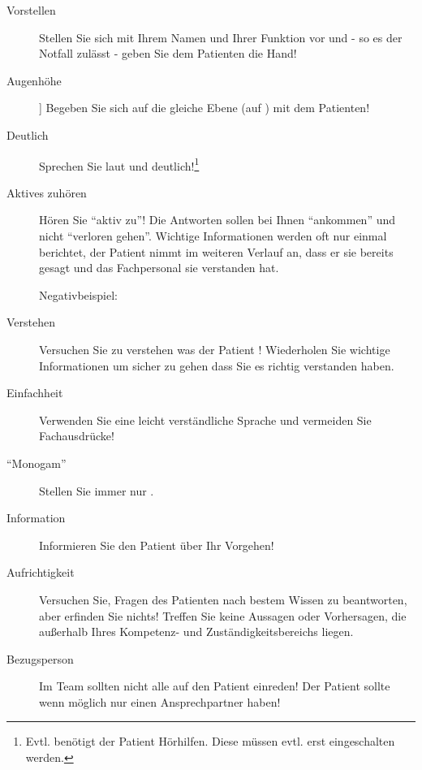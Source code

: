 \begin{description}
    \item[Vorstellen] Stellen Sie sich mit Ihrem Namen und Ihrer Funktion vor
    und - so es der Notfall zulässt - geben Sie dem Patienten die Hand!
    \item[Augenhöhe]] Begeben Sie sich auf die gleiche Ebene (auf )
    mit dem Patienten!
    \item[Deutlich] Sprechen Sie laut und deutlich!\footnote{Evtl. benötigt der
    Patient Hörhilfen. Diese müssen evtl. erst eingeschalten werden.}
    \item[Aktives zuhören] Hören Sie "`aktiv zu"'! Die Antworten sollen bei
    Ihnen "`ankommen"' und nicht "`verloren gehen"'. Wichtige Informationen werden oft nur einmal
    berichtet, der Patient nimmt im weiteren Verlauf an, dass er sie bereits
    gesagt und das Fachpersonal sie verstanden hat.
    
    Negativbeispiel: 
    \item[Verstehen] Versuchen Sie zu verstehen was
    der Patient ! Wiederholen Sie wichtige Informationen um sicher zu
    gehen dass Sie es richtig verstanden haben.
    \item[Einfachheit] Verwenden Sie eine leicht verständliche Sprache und
    vermeiden Sie Fachausdrücke!
    \item["`Monogam"'] Stellen Sie immer nur .
    \item[Information] Informieren Sie den Patient über Ihr Vorgehen!
    \item[Aufrichtigkeit] Versuchen Sie, Fragen des Patienten nach bestem Wissen
    zu beantworten, aber erfinden Sie nichts!  Treffen Sie keine Aussagen oder Vorhersagen, die außerhalb
    Ihres Kompetenz- und Zuständigkeitsbereichs liegen.
    \item[Bezugsperson] Im Team sollten nicht alle auf den Patient einreden! Der
    Patient sollte wenn möglich nur einen Ansprechpartner
    haben!\label{topic:einer-redet}
\end{description}


